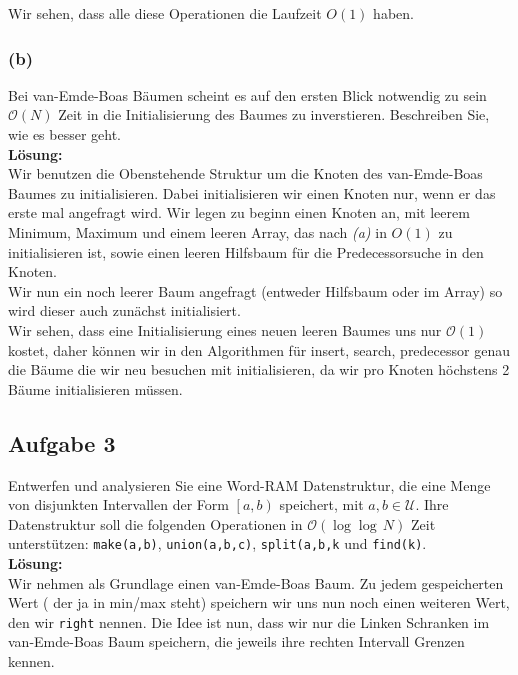 \documentclass[11pt,a4paper,ngerman]{article}
\begin{document}
Wir sehen, dass alle diese Operationen die Laufzeit $O(1)$ haben.
\subsubsection*{(b)}

Bei van-Emde-Boas  Bäumen scheint es auf den ersten Blick notwendig zu sein $\mathcal{O}(N)$ Zeit in die Initialisierung des Baumes zu inverstieren. Beschreiben Sie, wie es besser geht.\\

\noindent\textbf{Lösung:}\\

Wir benutzen die Obenstehende Struktur um die Knoten des van-Emde-Boas Baumes zu initialisieren. Dabei initialisieren wir einen Knoten nur,
wenn er das erste mal angefragt wird. Wir legen zu beginn einen Knoten an, mit leerem Minimum, Maximum und einem leeren Array,
das nach \emph{(a)} in $O(1)$ zu initialisieren ist, sowie einen leeren Hilfsbaum für die Predecessorsuche in den Knoten.\\

Wir nun ein noch leerer Baum angefragt (entweder Hilfsbaum oder im Array) so wird dieser auch zunächst initialisiert.\\

Wir sehen, dass eine Initialisierung eines neuen leeren Baumes uns nur $\mathcal{O}(1)$ kostet, daher können wir in den Algorithmen für insert, search, predecessor genau die Bäume die wir neu besuchen mit initialisieren, da wir pro Knoten höchstens 2 Bäume initialisieren müssen.

\subsection*{Aufgabe 3}

Entwerfen und analysieren Sie eine Word-RAM Datenstruktur, die eine Menge von disjunkten Intervallen der Form $\left[a,b\right)$ speichert, mit $a,b \in \mathcal{U}$. Ihre Datenstruktur soll die folgenden Operationen in $\mathcal{O}(\log\log \, N)$ Zeit unterstützen: \lstinline|make(a,b)|, \lstinline|union(a,b,c)|, \lstinline|split(a,b,k| und \lstinline|find(k)|.\\

\noindent\textbf{Lösung:}\\

Wir nehmen als Grundlage einen van-Emde-Boas Baum. Zu jedem gespeicherten Wert ( der ja in min/max steht) speichern wir uns nun noch einen weiteren Wert, den wir \lstinline|right| nennen. Die Idee ist nun, dass wir nur die Linken Schranken im van-Emde-Boas Baum speichern, die jeweils ihre rechten Intervall Grenzen kennen.\\
\end{document}
